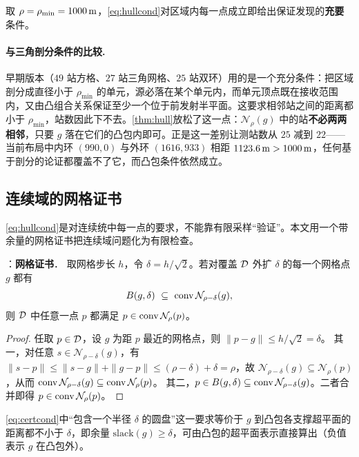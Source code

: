 取 $\rho=\rho_{\min}=1000\,\mathrm{m}$，\cref{eq:hullcond}对区域内每一点成立即给出保证发现的\textbf{充要}条件。

\paragraph{与三角剖分条件的比较.} 早期版本（$49$ 站方格、$27$ 站三角网格、$25$ 站双环）用的是一个充分条件：把区域剖分成直径小于 $\rho_{\min}$ 的单元，源必落在某个单元内，而单元顶点既在接收范围内，又由凸组合关系保证至少一个位于前发射半平面。这要求相邻站之间的距离都小于 $\rho_{\min}$，站数因此下不去。\cref{thm:hull}放松了这一点：$\mathcal N_\rho(g)$ 中的站\textbf{不必两两相邻}，只要 $g$ 落在它们的凸包内即可。正是这一差别让测站数从 $25$ 减到 $22$——当前布局中内环 $(990,0)$ 与外环 $(1616,933)$ 相距 $1123.6\,\mathrm{m}>1000\,\mathrm{m}$，任何基于剖分的论证都覆盖不了它，而凸包条件依然成立。

\subsection{连续域的网格证书}\label{sec:q4:cert}

\cref{eq:hullcond}是对连续统中每一点的要求，不能靠有限采样“验证”。本文用一个带余量的网格证书把连续域问题化为有限检查。

\begin{theorem}：\textbf{网格证书}．\label{thm:cert}
取网格步长 $h$，令 $\delta=h/\sqrt2$。若对覆盖 $\mathcal{D}$ 外扩 $\delta$ 的每一个网格点 $g$ 都有
\begin{equation}\label{eq:certcond}
  B(g,\delta)\ \subseteq\ \operatorname{conv} \mathcal N_{\rho-\delta}(g),
\end{equation}
则 $\mathcal{D}$ 中任意一点 $p$ 都满足 $p\in\operatorname{conv} \mathcal N_{\rho}(p)$。
\end{theorem}
\begin{proof}
任取 $p\in\mathcal{D}$，设 $g$ 为距 $p$ 最近的网格点，则 $\|p-g\|\le h/\sqrt2=\delta$。
其一，对任意 $s\in \mathcal N_{\rho-\delta}(g)$，有 $\|s-p\|\le\|s-g\|+\|g-p\|\le(\rho-\delta)+\delta=\rho$，故
$\mathcal N_{\rho-\delta}(g)\subseteq \mathcal N_\rho(p)$，从而 $\operatorname{conv} \mathcal N_{\rho-\delta}(g)\subseteq\operatorname{conv} \mathcal N_\rho(p)$。
其二，$p\in B(g,\delta)\subseteq\operatorname{conv} \mathcal N_{\rho-\delta}(g)$。二者合并即得 $p\in\operatorname{conv} \mathcal N_\rho(p)$。
\end{proof}

\cref{eq:certcond}中“包含一个半径 $\delta$ 的圆盘”这一要求等价于 $g$ 到凸包各支撑超平面的距离都不小于 $\delta$，即余量 $\mathrm{slack}(g)\ge\delta$，可由凸包的超平面表示直接算出（负值表示 $g$ 在凸包外）。


